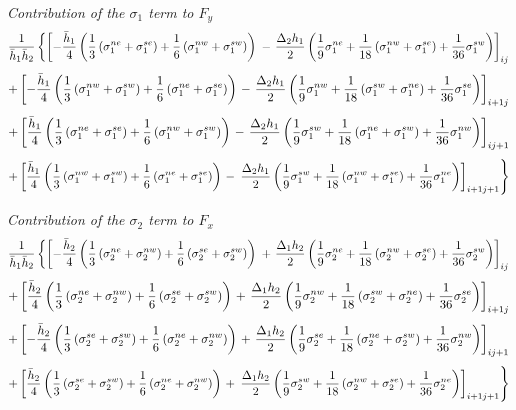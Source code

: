 {\it Contribution of the $\sigma_1$ term to $F_y$}
$$
{1\over \bar{h}_1\bar{h}_2}\left\{ 
\left[-{\bar{h}_1\over 4}
  \left({1\over 3}\left(\sigma_1^{ne}+\sigma_1^{se}\right) 
       +{1\over
6}\left(\sigma_1^{nw}+\sigma_1^{sw}\right)\right)\right.\right.
-\left.{\Delta_2h_1\over 2}
      \left({1\over 9}\sigma_1^{ne}
           +{1\over 18}\left(\sigma_1^{nw}+\sigma_1^{se}\right)
           +{1\over 36}\sigma_1^{sw}\right)\right]_{ij} $$
$$
+\left[-{\bar{h}_1\over 4}
 \left({1\over 3}\left(\sigma_1^{nw}+\sigma_1^{sw}\right) 
      +{1\over
6}\left(\sigma_1^{ne}+\sigma_1^{se}\right)\right)\right.
-\left.{\Delta_2h_1\over 2}
      \left({1\over 9}\sigma_1^{nw}
           +{1\over 18}\left(\sigma_1^{sw}+\sigma_1^{ne}\right)
           +{1\over 36}\sigma_1^{se}\right)\right]_{i+1j} $$
$$
+\left[{\bar{h}_1\over 4}
 \left( {1\over 3}\left(\sigma_1^{ne}+\sigma_1^{se}\right) 
       +{1\over
6}\left(\sigma_1^{nw}+\sigma_1^{sw}\right)\right)\right.
-\left.{\Delta_2h_1\over 2}
      \left({1\over 9}\sigma_1^{sw}
           +{1\over 18}\left(\sigma_1^{ne}+\sigma_1^{sw}\right)
           +{1\over 36}\sigma_1^{nw}\right)\right]_{ij+1} $$
$$
+\left[{\bar{h}_1\over 4}
 \left( {1\over 3}\left(\sigma_1^{nw}+\sigma_1^{sw}\right) 
       +{1\over
6}\left(\sigma_1^{ne}+\sigma_1^{se}\right)\right)\right.
-\left.\left.{\Delta_2h_1\over 2}
      \left({1\over 9}\sigma_1^{sw}
           +{1\over 18}\left(\sigma_1^{nw}+\sigma_1^{se}\right)
           +{1\over 36}\sigma_1^{ne}\right)\right]_{i+1j+1} \right\} $$

{\it Contribution of the $\sigma_2$ term to $F_x$}
$$
{1\over \bar{h}_1\bar{h}_2}\left\{ 
\left[-{\bar{h}_2\over 4}\left( 
        {1\over 3}\left(\sigma_2^{ne}+\sigma_2^{nw}\right)  
       +{1\over
6}\left(\sigma_2^{se}+\sigma_2^{sw}\right)\right)\right.\right.
+\left.{\Delta_1h_2\over 2}\left({1\over 9}\sigma_2^{ne}
           +{1\over 18}\left(\sigma_2^{nw}+\sigma_2^{se}\right)
           +{1\over 36}\sigma_2^{sw}\right)\right]_{ij} $$
$$
+\left[{\bar{h}_2\over 4}\left( 
         {1\over 3}\left(\sigma_2^{ne}+\sigma_2^{nw}\right) 
        +{1\over
6}\left(\sigma_2^{se}+\sigma_2^{sw}\right)\right)\right.
+\left.{\Delta_1h_2\over 2}\left({1\over 9}\sigma_2^{nw}
           +{1\over 18}\left(\sigma_2^{sw}+\sigma_2^{ne}\right)
           +{1\over 36}\sigma_2^{se}\right)\right]_{i+1j} $$
$$
+\left[-{\bar{h}_2\over 4}\left( 
         {1\over 3}\left(\sigma_2^{se}+\sigma_2^{sw}\right) 
        +{1\over
6}\left(\sigma_2^{ne}+\sigma_2^{nw}\right)\right)\right.
+\left.{\Delta_1h_2\over 2}\left({1\over 9}\sigma_2^{se}
           +{1\over 18}\left(\sigma_2^{ne}+\sigma_2^{sw}\right)
           +{1\over 36}\sigma_2^{nw}\right)\right]_{ij+1} $$
$$
+\left[{\bar{h}_2\over 4}\left( 
         {1\over 3}\left(\sigma_2^{se}+\sigma_2^{sw}\right) 
        +{1\over
6}\left(\sigma_2^{ne}+\sigma_2^{nw}\right)\right)\right.
+\left.\left.{\Delta_1h_2\over 2}
      \left({1\over 9}\sigma_2^{sw}
           +{1\over 18}\left(\sigma_2^{nw}+\sigma_2^{se}\right)
           +{1\over 36}\sigma_2^{ne}\right)\right]_{i+1j+1}\right\} $$

